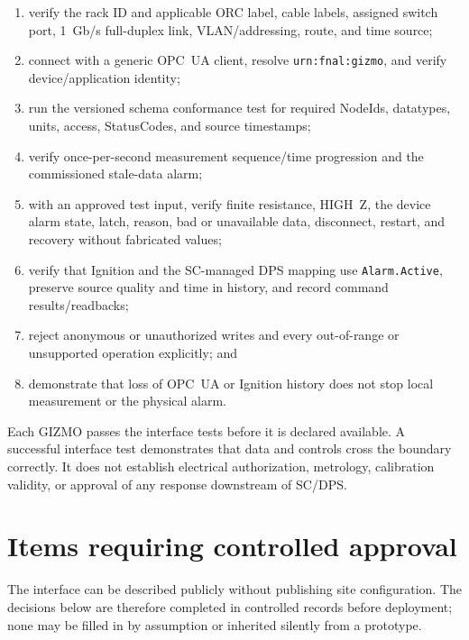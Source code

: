 \documentclass{cernatlasnote}
\newcommand{\code}[1]{\nolinkurl{#1}}
\begin{document}
\begin{enumerate}
  \item verify the rack ID and applicable ORC label, cable labels, assigned
  switch port, 1~Gb/s full-duplex link, VLAN/addressing, route, and time source;
  \item connect with a generic OPC~UA client, resolve
  \code{urn:fnal:gizmo}, and verify device/application identity;
  \item run the versioned schema conformance test for required NodeIds,
  datatypes, units, access, StatusCodes, and source timestamps;
  \item verify once-per-second measurement sequence/time progression and the
  commissioned stale-data alarm;
  \item with an approved test input, verify finite resistance, HIGH~Z, the
  device alarm state, latch, reason, bad or unavailable data, disconnect,
  restart, and
  recovery without fabricated values;
  \item verify that Ignition and the SC-managed DPS mapping use
  \code{Alarm.Active}, preserve source quality and time in history, and record
  command results/readbacks;
  \item reject anonymous or unauthorized writes and every out-of-range or
  unsupported operation explicitly; and
  \item demonstrate that loss of OPC~UA or Ignition history does not stop local
  measurement or the physical alarm.
\end{enumerate}

Each GIZMO passes the interface tests before it is declared available. A
successful interface test demonstrates that data and controls cross the
boundary correctly. It does not establish electrical authorization, metrology,
calibration validity, or approval of any response downstream of SC/DPS.

\section{Items requiring controlled approval}

The interface can be described publicly without publishing site configuration.
The decisions below are therefore completed in controlled records before
deployment; none may be filled in by assumption or inherited silently from a
prototype.
\end{document}
